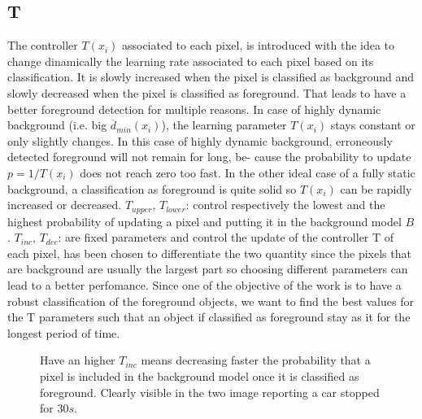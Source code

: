 \subsection*{T}
The controller $T(x_i)$ associated to each pixel, is introduced with the idea to change dinamically the learning rate associated to each pixel based on its classification. It is slowly increased when the pixel is classified as background and slowly decreased when the pixel is classified as foreground. That leads to have a better foreground detection for multiple reasons. \newline
In case of highly dynamic background (i.e. big $\overline{d}_{min}(x_i)$), the learning parameter $T(x_i)$ stays constant or only slightly changes. In this case of highly dynamic background, erroneously detected foreground will not remain for long, be-
cause the probability to update $p = 1/T(x_i)$ does not reach
zero too fast. \newline
In the other ideal case of a fully static background, a classification as foreground is quite solid so $T(x_i)$ can be rapidly increased or decreased. \newline
$T_{upper}$, $T_{lower}$: control respectively the lowest and the highest probability of updating a pixel and putting it in the background model $B$. \newline
$T_{inc}$, $T_{dec}$: are fixed parameters and control the update of the controller T of each pixel, has been chosen to differentiate the two quantity since the pixels that are background are usually the largest part so choosing different parameters can lead to a better perfomance.\newline
Since one of the objective of the work is to have a robust classification of the foreground objects, we want to find the best values for the T parameters such that an object if classified as foreground stay as it for the longest period of time. 
\begin{figure}[!t]
    \centering
    \newline
    \caption{Have an higher $T_{inc}$ means decreasing faster the probability that a pixel is included in the background model once it is classified as foreground. Clearly visible in the two image reporting a car stopped for $30s$.}
\end{figure}


